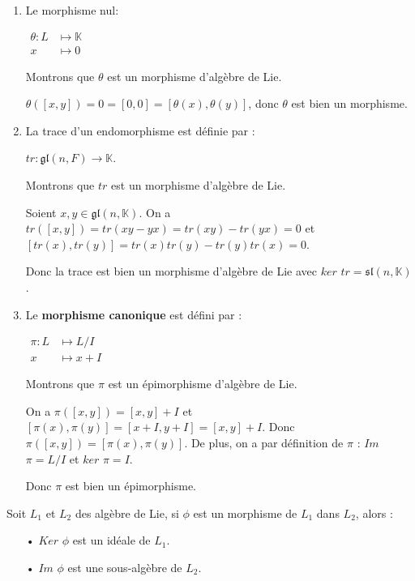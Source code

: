 \documentclass[a4paper,openany,12pt]{report}
\newcommand{\KK}{\mathbb{K}}
\newcommand{\gl}{\mathfrak{gl}}
\newcommand{\ssl}{\mathfrak{sl}}
\theoremstyle{break}
{\theorembodyfont{\upshape}
\newtheorem*{rmq}{Remarque :}
\newtheorem*{prv}{Preuve :}
\newtheorem*{ex}{Exemples :}
\newtheorem*{exe}{Exemple : }
\newtheorem*{nota}{Notation :}
\newtheorem*{dem}{D\'emonstration :}}
\begin{document}
\begin{ex}
\begin{enumerate}

\item Le morphisme nul:
\begin{center} 
$\begin{aligned} \theta: L & \longmapsto \KK \\ x & \longmapsto 0 \end{aligned}$
\end{center}
Montrons que $\theta$ est un morphisme d'algèbre de Lie.

$\theta([x,y]) = 0 = [0,0] = [\theta(x),\theta(y)]$, donc $\theta$ est bien un morphisme.

\item La trace d'un endomorphisme est définie par :
\begin{center}
$tr: \gl(n,F) \longrightarrow \KK$.
\end{center}
Montrons que $tr$ est un morphisme d’algèbre de Lie.

Soient $x,y \in  \gl(n,\KK)$. On a $tr([x,y]) = tr(xy-yx) = tr(xy)-tr(yx) = 0$
et $[tr(x),tr(y)] = tr(x)tr(y)-tr(y)tr(x) = 0$.

Donc la trace est bien un morphisme d'algèbre de Lie avec $ker$ $tr = \ssl(n,\KK)$.

\item Le \textbf{morphisme canonique} est défini par : 
\begin{center}
$\begin{aligned} \pi: L & \longmapsto L/I \\ x & \longmapsto x+I\end{aligned}$
\end{center}
Montrons que $\pi$ est un épimorphisme d'algèbre de Lie.

On a $\pi([x,y]) = [x,y]+I$ et $[\pi(x),\pi(y)] = [x+I,y+I] = [x,y]+I$. Donc $\pi([x,y]) = [\pi(x),\pi(y)]$. De plus, on a par définition de $\pi$ : $Im$ $\pi = L/I$ et $ker$ $\pi = I$.

Donc $\pi$ est bien un épimorphisme.
\end{enumerate}
\end{ex}

\begin{rmq}
\quad Soit $L_{1}$ et $L_{2}$ des algèbre de Lie, si $\phi$ est un morphisme de $L_{1}$ dans $L_{2}$, alors :
\begin{itemize}
\item[•] $Ker$ $\phi$ est un idéale de $L_{1}$.
\item[•] $Im$ $\phi$ est une sous-algèbre de $L_{2}$.
\end{itemize}
\end{rmq}
\end{document}
